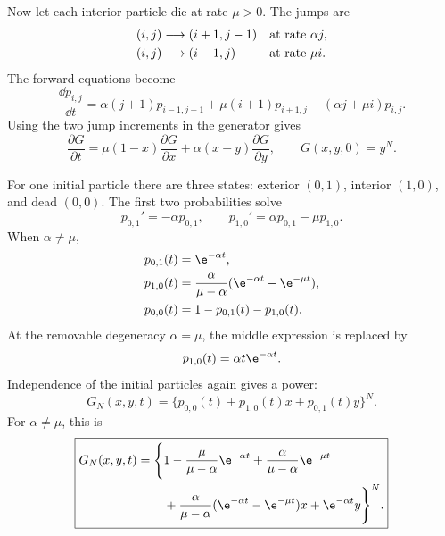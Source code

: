 Now let each interior particle die at rate \(\mu>0\).  The jumps are
\begin{align}
  (i,j)&\longrightarrow(i+1,j-1) &&\text{at rate }\alpha j,
  \notag\\
  (i,j)&\longrightarrow(i-1,j)   &&\text{at rate }\mu i.
  \label{eq:transfer-death-rates}
\end{align}
The forward equations become
\begin{equation}
  \frac{\dd p_{i,j}}{\dd t}
  =\alpha(j+1)p_{i-1,j+1}+\mu(i+1)p_{i+1,j}
   -(\alpha j+\mu i)p_{i,j}.
  \label{eq:transfer-death-forward}
\end{equation}
Using the two jump increments in the generator gives
\begin{equation}
  \frac{\partial G}{\partial t}
  =\mu(1-x)\frac{\partial G}{\partial x}
   +\alpha(x-y)\frac{\partial G}{\partial y},
  \qquad G(x,y,0)=y^N.
  \label{eq:transfer-death-pde}
\end{equation}

For one initial particle there are three states: exterior \((0,1)\), interior
\((1,0)\), and dead \((0,0)\).  The first two probabilities solve
\begin{equation}
  p_{0,1}'=-\alpha p_{0,1},
  \qquad
  p_{1,0}'=\alpha p_{0,1}-\mu p_{1,0}.
  \label{eq:transfer-death-single-odes}
\end{equation}
When \(\alpha\neq\mu\),
\begin{align}
  p_{0,1}(t)&=\e^{-\alpha t},
  \notag\\
  p_{1,0}(t)&=\frac{\alpha}{\mu-\alpha}
              (\e^{-\alpha t}-\e^{-\mu t}),
  \notag\\
  p_{0,0}(t)&=1-p_{0,1}(t)-p_{1,0}(t).
  \label{eq:transfer-death-states}
\end{align}
At the removable degeneracy \(\alpha=\mu\), the middle expression is replaced by
\begin{equation}
  p_{1,0}(t)=\alpha t\e^{-\alpha t}.
  \label{eq:transfer-death-equal-rates}
\end{equation}
Independence of the initial particles again gives a power:
\begin{equation}
  G_N(x,y,t)
  =\{p_{0,0}(t)+p_{1,0}(t)x+p_{0,1}(t)y\}^{N}.
  \label{eq:G-transfer-death-compact}
\end{equation}
For \(\alpha\neq\mu\), this is
\begin{equation}
  \boxed{\begin{aligned}
  G_N(x,y,t)=\Bigg\{&
  1-\frac{\mu}{\mu-\alpha}\e^{-\alpha t}
    +\frac{\alpha}{\mu-\alpha}\e^{-\mu t} \\
  &+\frac{\alpha}{\mu-\alpha}
      (\e^{-\alpha t}-\e^{-\mu t})x
    +\e^{-\alpha t}y
  \Bigg\}^{N}.
  \end{aligned}}
  \label{eq:G-transfer-death}
\end{equation}

